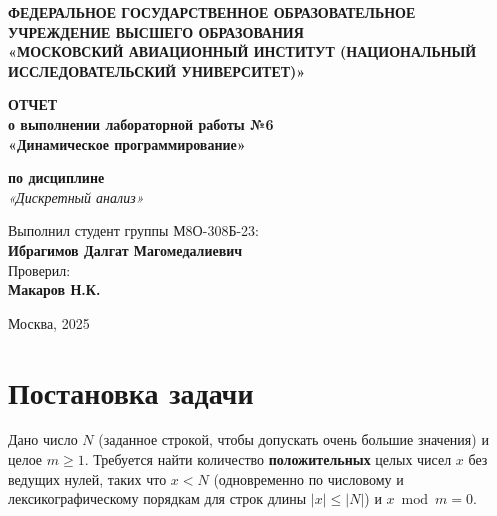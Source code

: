 \documentclass[12pt,a4paper]{article}
\begin{document}
\begin{titlepage}
    \begin{center}
        \vspace*{1cm}
        
        \textbf{ФЕДЕРАЛЬНОЕ ГОСУДАРСТВЕННОЕ ОБРАЗОВАТЕЛЬНОЕ УЧРЕЖДЕНИЕ ВЫСШЕГО ОБРАЗОВАНИЯ} \\
        \textbf{«МОСКОВСКИЙ АВИАЦИОННЫЙ ИНСТИТУТ (НАЦИОНАЛЬНЫЙ ИССЛЕДОВАТЕЛЬСКИЙ УНИВЕРСИТЕТ)»}
        
        \vspace{3cm}
        
        \textbf{\LARGE ОТЧЕТ} \\
        \vspace{0.5cm}
        \textbf{\Large о выполнении лабораторной работы №6} \\
        \vspace{0.5cm}
        \textbf{\Large «Динамическое программирование»} \\
        \vspace{1cm}
        
        \textbf{по дисциплине} \\
        \textit{«Дискретный анализ»}
        
        \vfill
        
        \begin{flushleft}
        Выполнил студент группы М8О-308Б-23: \\
        \textbf{Ибрагимов Далгат Магомедалиевич} \\
        \vspace{0.5cm}
        Проверил: \\
        \textbf{Макаров Н.К.}
        \end{flushleft}
        
        \vspace{3cm}
        
        Москва, 2025
    \end{center}
\end{titlepage}


\section*{Постановка задачи}

Дано число $N$ (заданное строкой, чтобы допускать очень большие значения) и целое $m \ge 1$.
Требуется найти количество \textbf{положительных} целых чисел $x$ без ведущих нулей, таких что
$x < N$ (одновременно по числовому и лексикографическому порядкам для строк длины $|x| \le |N|$) и $x \bmod m = 0$.
\end{document}
